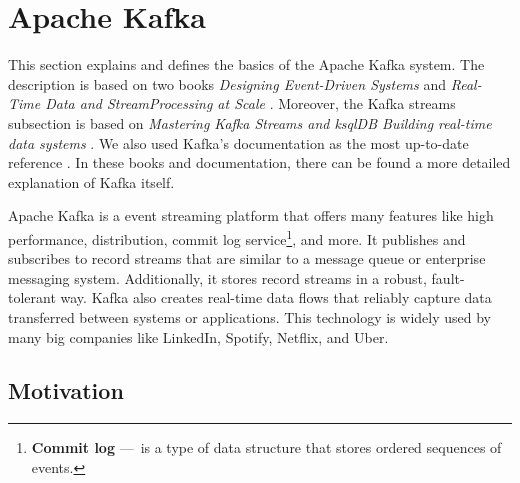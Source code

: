 \section{Apache Kafka}
\label{02:sec:title}

This section explains and defines the basics of the Apache Kafka system. The description is based on two books \emph{Designing Event-Driven Systems} \cite{apacheKafkaDesignDistributedSystems} and \emph{Real-Time Data and StreamProcessing at Scale} \cite{apacheKafkaDefinitiveGuide}. Moreover, the Kafka streams subsection is based on \emph{Mastering Kafka Streams and ksqlDB Building real-time data systems} \cite{kafkaStreamsBook}. We also used Kafka's documentation as the most up-to-date reference \cite{kafkaDocumentation}. In these books and documentation, there can be found a more detailed explanation of Kafka itself.

Apache Kafka is a event streaming platform that offers many features like high performance, distribution, commit log service\footnote{\textbf{Commit log} 
---\ is a type of data structure that stores ordered sequences of events.}, and more. It publishes and subscribes to record streams that are similar to a message queue or enterprise messaging system. Additionally, it stores record streams in a robust, fault-tolerant way. Kafka also creates real-time data flows that reliably capture data transferred between systems or applications. This technology is widely used by many big companies like LinkedIn, Spotify, Netflix, and Uber.
\subsection*{Motivation \cite{02-bachelor-thesis}} 
\label{kafka:motivation}

